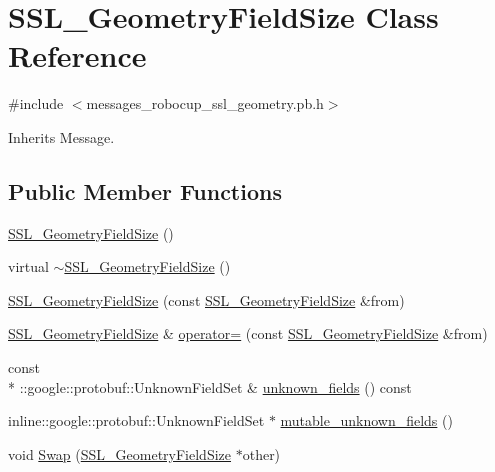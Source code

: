 \hypertarget{class_s_s_l___geometry_field_size}{\section{S\-S\-L\-\_\-\-Geometry\-Field\-Size Class Reference}
\label{class_s_s_l___geometry_field_size}
}


{\ttfamily \#include $<$messages\-\_\-robocup\-\_\-ssl\-\_\-geometry.\-pb.\-h$>$}



Inherits Message.

\subsection*{Public Member Functions}
\begin{DoxyCompactItemize}
\item 
\hyperlink{class_s_s_l___geometry_field_size_a95e2f3397a04ef8f2ce3c7b9b4ec4aaf}{S\-S\-L\-\_\-\-Geometry\-Field\-Size} ()
\item 
virtual \hyperlink{class_s_s_l___geometry_field_size_ac2f477247260c1c167e77cb023455431}{$\sim$\-S\-S\-L\-\_\-\-Geometry\-Field\-Size} ()
\item 
\hyperlink{class_s_s_l___geometry_field_size_aaca23f74f7a894830c27a8d796ea944b}{S\-S\-L\-\_\-\-Geometry\-Field\-Size} (const \hyperlink{class_s_s_l___geometry_field_size}{S\-S\-L\-\_\-\-Geometry\-Field\-Size} \&from)
\item 
\hyperlink{class_s_s_l___geometry_field_size}{S\-S\-L\-\_\-\-Geometry\-Field\-Size} \& \hyperlink{class_s_s_l___geometry_field_size_af569fb36b3143e8a6ebb344a189fb30b}{operator=} (const \hyperlink{class_s_s_l___geometry_field_size}{S\-S\-L\-\_\-\-Geometry\-Field\-Size} \&from)
\item 
const \\*
\-::google\-::protobuf\-::\-Unknown\-Field\-Set \& \hyperlink{class_s_s_l___geometry_field_size_a06635c0658d1485973e9c975d8d865dd}{unknown\-\_\-fields} () const 
\item 
inline\-::google\-::protobuf\-::\-Unknown\-Field\-Set $\ast$ \hyperlink{class_s_s_l___geometry_field_size_aabac6caab2fb7062c49f41bb0d7607a6}{mutable\-\_\-unknown\-\_\-fields} ()
\item 
void \hyperlink{class_s_s_l___geometry_field_size_ae5f47673f64c375c4b43bb0a10d99c7b}{Swap} (\hyperlink{class_s_s_l___geometry_field_size}{S\-S\-L\-\_\-\-Geometry\-Field\-Size} $\ast$other)
\item 

\end{DoxyCompactItemize}
